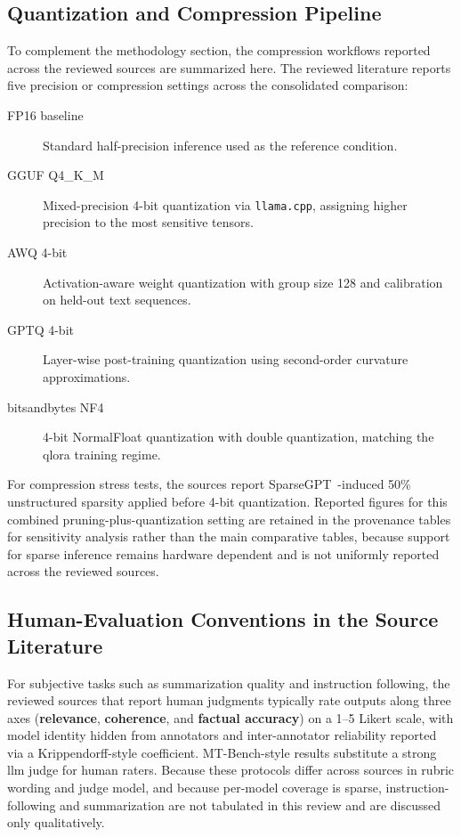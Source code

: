 \subsection{Quantization and Compression Pipeline}
\label{subsec:appendix_quantization_pipeline}
To complement the methodology section, the compression workflows reported across the reviewed sources are summarized here. The reviewed literature reports five precision or compression settings across the consolidated comparison:
\begin{description}
    \item[FP16 baseline] Standard half-precision inference used as the reference condition.
    \item[GGUF Q4\_K\_M] Mixed-precision 4-bit quantization via \texttt{llama.cpp}, assigning higher precision to the most sensitive tensors.
    \item[AWQ 4-bit] Activation-aware weight quantization with group size 128 and calibration on held-out text sequences.
    \item[GPTQ 4-bit] Layer-wise post-training quantization using second-order curvature approximations.
    \item[bitsandbytes NF4] 4-bit NormalFloat quantization with double quantization, matching the \gls{qlora} training regime.
\end{description}

For compression stress tests, the sources report SparseGPT~\citep{frantar2023sparsegpt}-induced 50\% unstructured sparsity applied before 4-bit quantization. Reported figures for this combined pruning-plus-quantization setting are retained in the provenance tables for sensitivity analysis rather than the main comparative tables, because support for sparse inference remains hardware dependent and is not uniformly reported across the reviewed sources.

\subsection{Human-Evaluation Conventions in the Source Literature}
\label{subsec:appendix_human_eval}
For subjective tasks such as summarization quality and instruction following, the reviewed sources that report human judgments typically rate outputs along three axes (\textbf{relevance}, \textbf{coherence}, and \textbf{factual accuracy}) on a 1--5 Likert scale, with model identity hidden from annotators and inter-annotator reliability reported via a Krippendorff-style coefficient. MT-Bench-style results substitute a strong \gls{llm} judge for human raters. Because these protocols differ across sources in rubric wording and judge model, and because per-model coverage is sparse, instruction-following and summarization are not tabulated in this review and are discussed only qualitatively.
